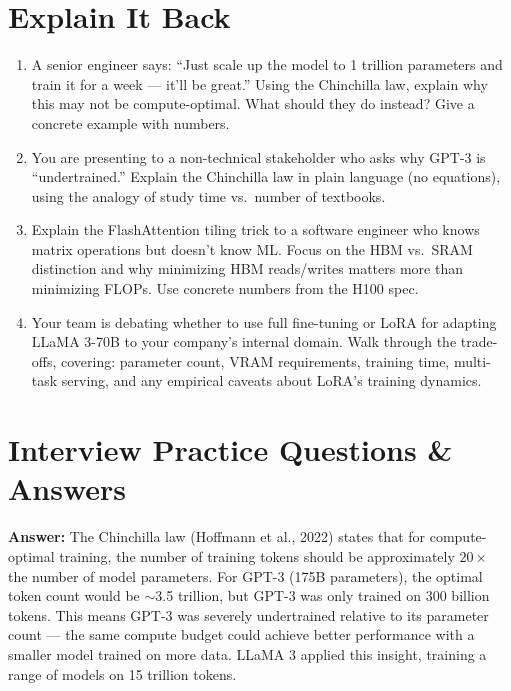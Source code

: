 \documentclass[11pt, a4paper]{article}
\begin{document}
\newpage
\section{Explain It Back}

\begin{enumerate}[leftmargin=2em]
  \item A senior engineer says: ``Just scale up the model to 1 trillion parameters and train it for a week --- it'll be great.'' Using the Chinchilla law, explain why this may not be compute-optimal. What should they do instead? Give a concrete example with numbers.

  \item You are presenting to a non-technical stakeholder who asks why GPT-3 is ``undertrained.'' Explain the Chinchilla law in plain language (no equations), using the analogy of study time vs.\ number of textbooks.

  \item Explain the FlashAttention tiling trick to a software engineer who knows matrix operations but doesn't know ML. Focus on the HBM vs.\ SRAM distinction and why minimizing HBM reads/writes matters more than minimizing FLOPs. Use concrete numbers from the H100 spec.

  \item Your team is debating whether to use full fine-tuning or LoRA for adapting LLaMA 3-70B to your company's internal domain. Walk through the trade-offs, covering: parameter count, VRAM requirements, training time, multi-task serving, and any empirical caveats about LoRA's training dynamics.
\end{enumerate}

\newpage
\section{Interview Practice Questions \& Answers}

\begin{notebox}
\textbf{Answer:} The Chinchilla law (Hoffmann et al., 2022) states that for compute-optimal training, the number of training tokens should be approximately $20\times$ the number of model parameters. For GPT-3 (175B parameters), the optimal token count would be $\sim$3.5 trillion, but GPT-3 was only trained on 300 billion tokens. This means GPT-3 was severely undertrained relative to its parameter count --- the same compute budget could achieve better performance with a smaller model trained on more data. LLaMA 3 applied this insight, training a range of models on 15 trillion tokens.
\end{notebox}
\end{document}
